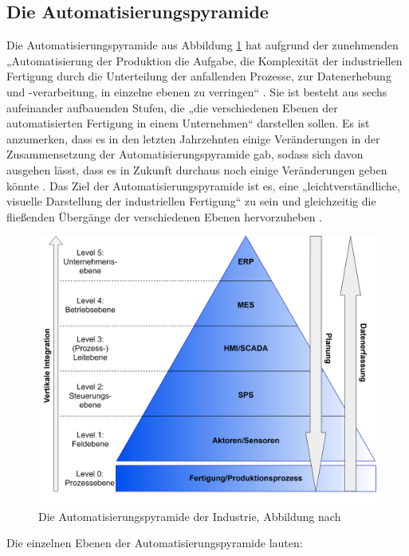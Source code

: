 \subsection{Die Automatisierungspyramide}\label{sec:Automatisierungspyramide}
Die Automatisierungspyramide aus Abbildung \ref{fig:Automatisierungspyramide} hat aufgrund der zunehmenden „Automatisierung der Produktion die Aufgabe, die Komplexität der industriellen Fertigung durch die Unterteilung der anfallenden Prozesse, zur Datenerhebung und -verarbeitung, in einzelne ebenen zu verringen“ \cite[S.49]{14}. Sie ist besteht aus sechs aufeinander aufbauenden Stufen, die „die verschiedenen Ebenen der automatisierten Fertigung in einem Unternehmen“ \cite[S.49]{14} darstellen sollen. Es ist anzumerken, dass es in den letzten Jahrzehnten einige Veränderungen in der Zusammensetzung der Automatisierungspyramide gab, sodass sich davon ausgehen lässt, dass es in Zukunft durchaus noch einige Veränderungen geben könnte \cite[S.49]{14}. Das Ziel der Automatisierungspyramide ist es, eine „leichtverständliche, visuelle Darstellung der industriellen Fertigung“ \cite[S.49]{14} zu sein und gleichzeitig die fließenden Übergänge der verschiedenen Ebenen hervorzuheben \cite[S.49]{14}.
\newpage
\begin{figure}[h]
	\centering
	\includegraphics[width=0.8\linewidth]{Bilder/A9_Automatisierungspyramide}
	\caption{Die Automatisierungspyramide der Industrie, Abbildung nach \cite[S.49]{14}}
	\label{fig:Automatisierungspyramide}
\end{figure}
\noindent Die einzelnen Ebenen der Automatisierungspyramide lauten:
